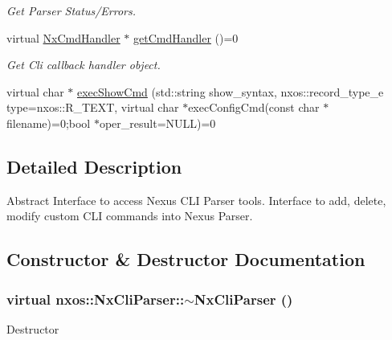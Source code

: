 \begin{DoxyCompactItemize}
\begin{DoxyCompactList}\small\item\em Get Parser Status/Errors. \item\end{DoxyCompactList}\item 
\hypertarget{classnxos_1_1NxCliParser_af058955d7c6dae444a5dab084342d03c}{
virtual \hyperlink{classnxos_1_1NxCmdHandler}{NxCmdHandler} $\ast$ \hyperlink{classnxos_1_1NxCliParser_af058955d7c6dae444a5dab084342d03c}{getCmdHandler} ()=0}
\label{classnxos_1_1NxCliParser_af058955d7c6dae444a5dab084342d03c}

\begin{DoxyCompactList}\small\item\em Get Cli callback handler object. \item\end{DoxyCompactList}\item 
virtual char $\ast$ \hyperlink{classnxos_1_1NxCliParser_a074e9c2b831c49885b7d324689442d97}{execShowCmd} (std::string show\_\-syntax, nxos::record\_\-type\_\-e type=nxos::R\_\-TEXT, virtual char $\ast$execConfigCmd(const char $\ast$filename)=0;bool $\ast$oper\_\-result=NULL)=0
\end{DoxyCompactItemize}


\subsection{Detailed Description}
Abstract Interface to access Nexus CLI Parser tools. Interface to add, delete, modify custom CLI commands into Nexus Parser. 

\subsection{Constructor \& Destructor Documentation}
\hypertarget{classnxos_1_1NxCliParser_ae7d5ada6ff25efd19ba95161fa60eeac}{
\subsubsection[{$\sim$NxCliParser}]{\setlength{\rightskip}{0pt plus 5cm}virtual nxos::NxCliParser::$\sim$NxCliParser ()}}
\label{classnxos_1_1NxCliParser_ae7d5ada6ff25efd19ba95161fa60eeac}
Destructor 

